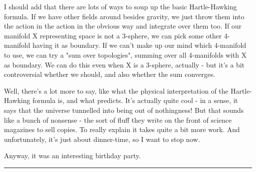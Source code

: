 I should add that there are lots of ways to soup up the basic
Hartle-Hawking formula.  If we have other fields around besides
gravity, we just throw them into the action in the action in the
obvious way and integrate over them too.  If our manifold X representing
space is not a 3-sphere, we can pick some other 4-manifold having it
as boundary.  If we can't make up our mind which 4-manifold to use, 
we can try a "sum over topologies", summing over all 4-manifolds
with X as boundary.  We can do this even when X is a 3-sphere, 
actually - but it's a bit controversial whether we should, and 
also whether the sum converges.  

Well, there's a lot more to say, like what the physical interpretation
of the Hartle-Hawking formula is, and what predicts.  It's actually quite 
cool - in a sense, it says that the universe tunnelled into being out of 
nothingness!  But that sounds like a bunch of nonsense - the sort of fluff 
they write on the front of science magazines to sell copies.  To really 
explain it takes quite a bit more work.  And unfortunately, it's just 
about dinner-time, so I want to stop now.  

Anyway, it was an interesting birthday party.  


 \par\noindent\rule{\textwidth}{0.4pt}


